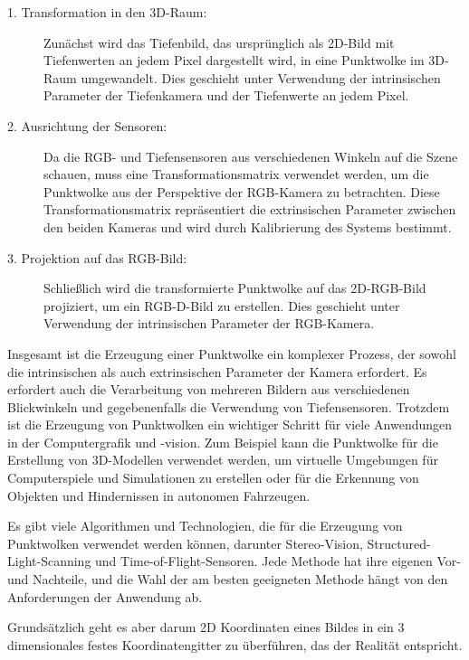\begin{description}
    \item[1. Transformation in den 3D-Raum:] Zunächst wird das Tiefenbild, das ursprünglich als 2D-Bild mit Tiefenwerten an jedem Pixel dargestellt wird, in eine Punktwolke im 3D-Raum umgewandelt. Dies geschieht unter Verwendung der intrinsischen Parameter der Tiefenkamera und der Tiefenwerte an jedem Pixel.
    
    \item [2. Ausrichtung der Sensoren:] Da die RGB- und Tiefensensoren aus verschiedenen Winkeln auf die Szene schauen, muss eine Transformationsmatrix verwendet werden, um die Punktwolke aus der Perspektive der RGB-Kamera zu betrachten. Diese Transformationsmatrix repräsentiert die extrinsischen Parameter zwischen den beiden Kameras und wird durch Kalibrierung des Systems bestimmt.
    
    \item[3. Projektion auf das RGB-Bild:] Schließlich wird die transformierte Punktwolke auf das 2D-RGB-Bild projiziert, um ein RGB-D-Bild zu erstellen. Dies geschieht unter Verwendung der intrinsischen Parameter der RGB-Kamera.
    \end{description}

    \cite[vgl.][Kapitel 5.3.1]{SWB-1681722674}

    


Insgesamt ist die Erzeugung einer Punktwolke ein komplexer Prozess, der sowohl die intrinsischen als auch extrinsischen Parameter der Kamera erfordert. Es erfordert auch die Verarbeitung von mehreren Bildern aus verschiedenen Blickwinkeln und gegebenenfalls die Verwendung von Tiefensensoren. Trotzdem ist die Erzeugung von Punktwolken ein wichtiger Schritt für viele Anwendungen in der Computergrafik und -vision. Zum Beispiel kann die Punktwolke für die Erstellung von 3D-Modellen verwendet werden, um virtuelle Umgebungen für Computerspiele und Simulationen zu erstellen oder für die Erkennung von Objekten und Hindernissen in autonomen Fahrzeugen.

Es gibt viele Algorithmen und Technologien, die für die Erzeugung von Punktwolken verwendet werden können, darunter Stereo-Vision, Structured-Light-Scanning und Time-of-Flight-Sensoren. Jede Methode hat ihre eigenen Vor- und Nachteile, und die Wahl der am besten geeigneten Methode hängt von den Anforderungen der Anwendung ab.

Grundsätzlich geht es aber darum 2D Koordinaten eines Bildes in ein 3 dimensionales festes Koordinatengitter zu überführen, das der Realität entspricht.


